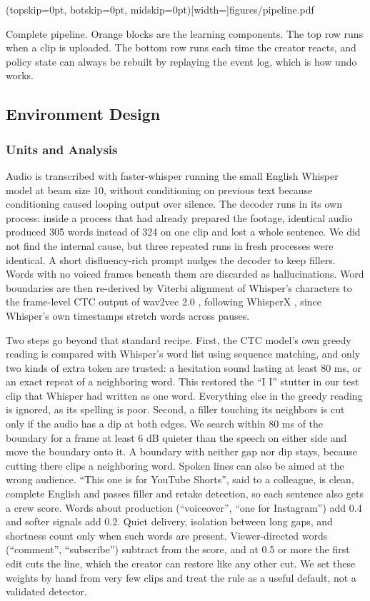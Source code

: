 \documentclass{ieeeaccess}
\begin{document}
\Figure[t!](topskip=0pt, botskip=0pt, midskip=0pt)[width=\textwidth]{figures/pipeline.pdf}
{\parbox[t]{0.91\textwidth}{\raggedright Complete pipeline. Orange blocks are the learning components. The top row runs when a clip is uploaded. The bottom row runs each time the creator reacts, and policy state can always be rebuilt by replaying the event log, which is how undo works.}\label{fig:pipeline}}

\subsection{Environment Design}

\subsubsection{Units and Analysis}
Audio is transcribed with faster-whisper running the small English Whisper model \cite{radford2023} at beam size 10, without conditioning on previous text because conditioning caused looping output over silence. The decoder runs in its own process: inside a process that had already prepared the footage, identical audio produced 305 words instead of 324 on one clip and lost a whole sentence. We did not find the internal cause, but three repeated runs in fresh processes were identical. A short disfluency-rich prompt nudges the decoder to keep fillers. Words with no voiced frames beneath them are discarded as hallucinations. Word boundaries are then re-derived by Viterbi alignment of Whisper's characters to the frame-level CTC output of wav2vec 2.0 \cite{baevski2020}, following WhisperX \cite{bain2023}, since Whisper's own timestamps stretch words across pauses.

Two steps go beyond that standard recipe. First, the CTC model's own greedy reading is compared with Whisper's word list using sequence matching, and only two kinds of extra token are trusted: a hesitation sound lasting at least 80 ms, or an exact repeat of a neighboring word. This restored the ``I I'' stutter in our test clip that Whisper had written as one word. Everything else in the greedy reading is ignored, as its spelling is poor. Second, a filler touching its neighbors is cut only if the audio has a dip at both edges. We search within 80 ms of the boundary for a frame at least 6 dB quieter than the speech on either side and move the boundary onto it. A boundary with neither gap nor dip stays, because cutting there clips a neighboring word.
Spoken lines can also be aimed at the wrong audience. ``This one is for YouTube Shorts'', said to a colleague, is clean, complete English and passes filler and retake detection, so each sentence also gets a crew score. Words about production (``voiceover'', ``one for Instagram'') add 0.4 and softer signals add 0.2. Quiet delivery, isolation between long gaps, and shortness count only when such words are present. Viewer-directed words (``comment'', ``subscribe'') subtract from the score, and at 0.5 or more the first edit cuts the line, which the creator can restore like any other cut. We set these weights by hand from very few clips and treat the rule as a useful default, not a validated detector.
\end{document}
